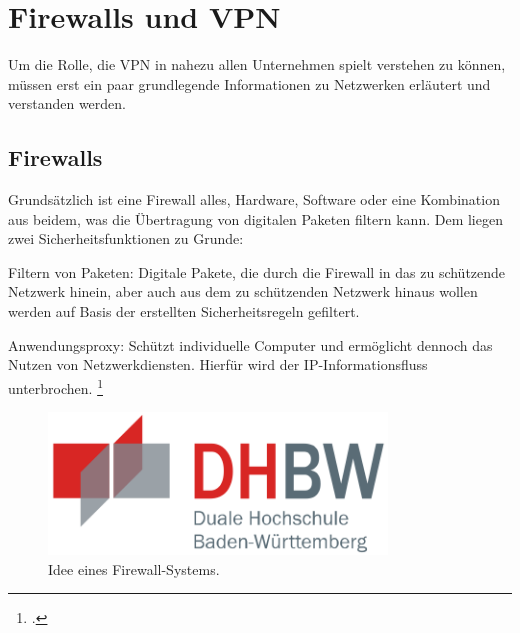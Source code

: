 \chapter{Firewalls und VPN} %
\label{cha:Firewalls und VPN}

Um die Rolle, die VPN in nahezu allen Unternehmen spielt verstehen zu können, müssen erst ein paar grundlegende Informationen zu Netzwerken erläutert und verstanden werden.

\section{Firewalls} %
\label{sec:Firewalls}

Grundsätzlich ist eine Firewall alles, Hardware, Software oder eine Kombination aus beidem, was die Übertragung von digitalen Paketen filtern kann. Dem liegen zwei Sicherheitsfunktionen zu Grunde:

\begin{description}
	\item Filtern von Paketen: Digitale Pakete, die durch die Firewall in das zu schützende Netzwerk hinein, aber auch aus dem zu schützenden Netzwerk hinaus wollen werden auf Basis der erstellten Sicherheitsregeln gefiltert.
	\item Anwendungsproxy: Schützt individuelle Computer und ermöglicht dennoch das Nutzen von Netzwerkdiensten. Hierfür wird der IP-Informationsfluss unterbrochen. \footcite[Vgl.][S. 99]{WHITMAN.2018}
\end{description}

\begin{figure}[htb]
	\centering
	\includegraphics[width=9cm]{graphics/dhbw.png}
	\caption[Idee eines Firewall-Systems]{Idee eines Firewall-Systems. \footnotemark}
	\label{abb:Firewall}
\end{figure}

